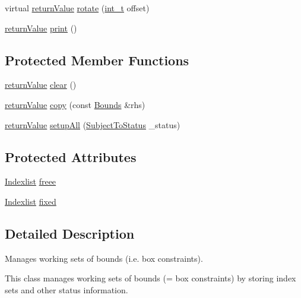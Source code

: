 \begin{DoxyCompactItemize}
\item 
virtual \hyperlink{_message_handling_8hpp_a81d556f613bfbabd0b1f9488c0fa865e}{return\+Value} \hyperlink{class_bounds_abe45f347747df4a323d1d55bc21a5914}{rotate} (\hyperlink{_types_8hpp_ab6fd6105e64ed14a0c9281326f05e623}{int\+\_\+t} offset)
\item 
\hyperlink{_message_handling_8hpp_a81d556f613bfbabd0b1f9488c0fa865e}{return\+Value} \hyperlink{class_bounds_a04ad16d13952adff7be66e8a82ab8281}{print} ()
\end{DoxyCompactItemize}
\subsection*{Protected Member Functions}
\begin{DoxyCompactItemize}
\item 
\hyperlink{_message_handling_8hpp_a81d556f613bfbabd0b1f9488c0fa865e}{return\+Value} \hyperlink{class_bounds_ad19e200f0cd0b476f5630d2516eb4d4c}{clear} ()
\item 
\hyperlink{_message_handling_8hpp_a81d556f613bfbabd0b1f9488c0fa865e}{return\+Value} \hyperlink{class_bounds_abb34af9c6fbd53b591aaa65db6108bac}{copy} (const \hyperlink{class_bounds}{Bounds} \&rhs)
\item 
\hyperlink{_message_handling_8hpp_a81d556f613bfbabd0b1f9488c0fa865e}{return\+Value} \hyperlink{class_bounds_ac8733669924bba05b64b3a0fb2e5c784}{setup\+All} (\hyperlink{_types_8hpp_a70a6a40d261a015ead8d43aa589383a4}{Subject\+To\+Status} \+\_\+status)
\end{DoxyCompactItemize}
\subsection*{Protected Attributes}
\begin{DoxyCompactItemize}
\item 
\hyperlink{class_indexlist}{Indexlist} \hyperlink{class_bounds_a0e915647e5ef1a3a48f17fea73ccf03f}{freee}
\item 
\hyperlink{class_indexlist}{Indexlist} \hyperlink{class_bounds_a7c4780c7710eec138bd4def344cedd69}{fixed}
\end{DoxyCompactItemize}


\subsection{Detailed Description}
Manages working sets of bounds (i.\+e. box constraints). 

This class manages working sets of bounds (= box constraints) by storing index sets and other status information.

